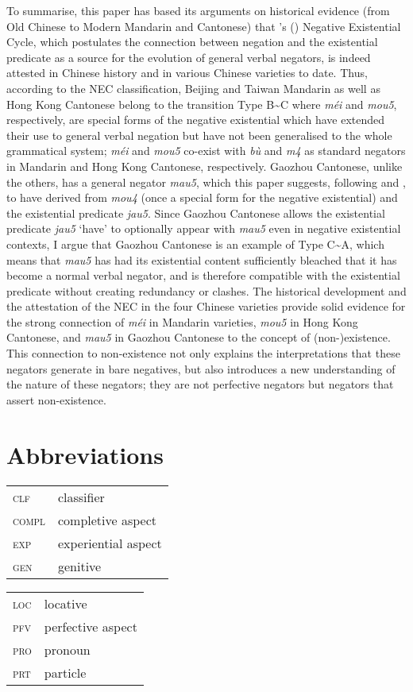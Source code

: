 \documentclass[output=paper,colorlinks,citecolor=brown,chinesefont]{langscibook}
\begin{document}
To summarise, this paper has based its arguments on historical evidence (from Old Chinese to Modern Mandarin and Cantonese) that \citeauthor{Croft1991}'s (\citeyear{Croft1991}) Negative Existential Cycle, which postulates the connection between negation and the existential predicate as a source for the evolution of general verbal negators, is indeed attested in Chinese history and in various Chinese varieties to date. Thus, according to the NEC classification, Beijing and Taiwan Mandarin as well as Hong Kong Cantonese belong to the transition Type B\sim C where \textit{méi} and \textit{mou5}, respectively, are special forms of the negative existential which have extended their use to general verbal negation but have not been generalised to the whole grammatical system; \textit{méi} and \textit{mou5} co-exist with \textit{bù} and \textit{m4} as standard negators in Mandarin and Hong Kong Cantonese, respectively. Gaozhou Cantonese, unlike the others, has a general negator \textit{mau5}, which this paper suggests, following \cite{Zhang2002} and \cite{Law2014}, to have derived from \textit{mou4} (once a special form for the negative existential) and the existential predicate \textit{jau5}. Since Gaozhou Cantonese allows the existential predicate \textit{jau5} `have' to optionally appear with \textit{mau5} even in negative existential contexts, I argue that Gaozhou Cantonese is an example of Type C\sim A, which means that \textit{mau5} has had its existential content sufficiently bleached that it has become a normal verbal negator, and is therefore compatible with the existential predicate without creating redundancy or clashes. The historical development and the attestation of the NEC in the four Chinese varieties provide solid evidence for the strong connection of \textit{méi} in Mandarin varieties, \textit{mou5} in Hong Kong Cantonese, and \textit{mau5} in Gaozhou Cantonese to the concept of (non-)existence. This connection to non-existence not only explains the interpretations that these negators generate in bare negatives, but also introduces a new understanding of the nature of these negators; they are not perfective negators but negators that assert non-existence. 

 
 
\section*{Abbreviations}
\begin{tabularx}{.5\textwidth}{@{}lQ}
\textsc{clf} & classifier\\
\textsc{compl} &	completive aspect\\
\textsc{exp} &	experiential aspect\\ 
\textsc{gen} & 	genitive\\ 
\end{tabularx}\begin{tabularx}{.5\textwidth}{lQ@{}}
\textsc{loc} &	locative\\
\textsc{pfv} &	perfective aspect\\ 
\textsc{pro} &	pronoun\\
\textsc{prt} & 	particle\\ 
\end{tabularx}
\end{document}
